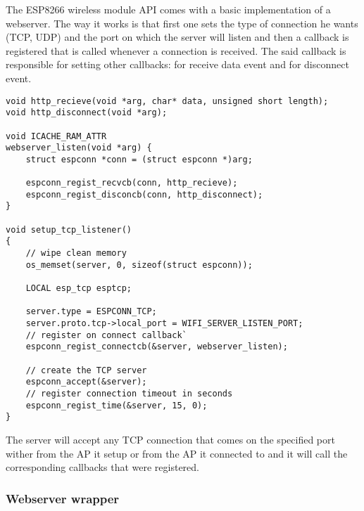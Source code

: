 \qquad The ESP8266 wireless module API comes with a basic implementation of a webserver. The way it works is that
first one sets the type of connection he wants (TCP, UDP) and the port on which the server will listen and
then a callback is registered that is called whenever a connection is received. The said callback is
responsible for setting other callbacks: for receive data event and for disconnect event.

\begin{lstlisting}[frame=single]
void http_recieve(void *arg, char* data, unsigned short length);
void http_disconnect(void *arg);

void ICACHE_RAM_ATTR
webserver_listen(void *arg) {
    struct espconn *conn = (struct espconn *)arg;

    espconn_regist_recvcb(conn, http_recieve);
    espconn_regist_disconcb(conn, http_disconnect);
}

void setup_tcp_listener()
{
    // wipe clean memory
    os_memset(server, 0, sizeof(struct espconn));

    LOCAL esp_tcp esptcp;

    server.type = ESPCONN_TCP;
    server.proto.tcp->local_port = WIFI_SERVER_LISTEN_PORT;
    // register on connect callback`
    espconn_regist_connectcb(&server, webserver_listen);

    // create the TCP server
    espconn_accept(&server);
    // register connection timeout in seconds
    espconn_regist_time(&server, 15, 0);
}
\end{lstlisting}

The server will accept any TCP connection that comes on the specified port wither from the AP it setup or from
the AP it connected to and it will call the corresponding callbacks that were registered.

\subsubsection{Webserver wrapper}

